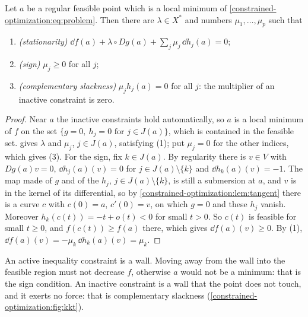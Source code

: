 \begin{notechapter}
\begin{theorem}
\label{constrained-optimization:thm:kkt}
Let $a$ be a regular feasible point which is a local minimum of
\eqref{constrained-optimization:eq:problem}. Then there are
$\lambda\in X^*$ and numbers $\mu_1,\dots,\mu_p$ such that
\begin{enumerate}[nosep]
  \item \emph{(stationarity)}
        $\dd f(a) + \lambda\circ Dg(a) + \sum_j\mu_j\,\dd h_j(a) = 0$;
  \item \emph{(sign)} $\mu_j\geq0$ for all $j$;
  \item \emph{(complementary slackness)} $\mu_jh_j(a) = 0$ for all $j$:
        the multiplier of an inactive constraint is zero.
\end{enumerate}
\end{theorem}

\begin{proof}
Near $a$ the inactive constraints hold automatically, so $a$ is a local
minimum of $f$ on the set
$\{g = 0,\ h_j = 0 \text{ for } j\in J(a)\}$, which is contained in the
feasible set.  gives
$\lambda$ and $\mu_j$, $j\in J(a)$, satisfying (1); put $\mu_j = 0$ for
the other indices, which gives (3). For the sign, fix $k\in J(a)$. By
regularity there is $v\in V$ with $Dg(a)v = 0$, $\dd h_j(a)(v) = 0$ for
$j\in J(a)\setminus\{k\}$ and $\dd h_k(a)(v) = -1$. The map made of $g$
and of the $h_j$, $j\in J(a)\setminus\{k\}$, is still a submersion at
$a$, and $v$ is in the kernel of its differential, so by
\cref{constrained-optimization:lem:tangent} there is a curve $c$ with
$c(0) = a$, $c'(0) = v$, on which $g = 0$ and these $h_j$ vanish.
Moreover $h_k(c(t)) = -t + o(t) < 0$ for small $t > 0$. So $c(t)$ is
feasible for small $t\geq0$, and $f(c(t))\geq f(a)$ there, which gives
$\dd f(a)(v)\geq0$. By (1), $\dd f(a)(v) = -\mu_k\,\dd h_k(a)(v) = \mu_k$.
\end{proof}

\begin{intuition}
An active inequality constraint is a wall. Moving away from the wall into
the feasible region must not decrease $f$, otherwise $a$ would not be a
minimum: that is the sign condition. An inactive constraint is a wall
that the point does not touch, and it exerts no force: that is
complementary slackness (\cref{constrained-optimization:fig:kkt}).
\end{intuition}


\end{notechapter}
